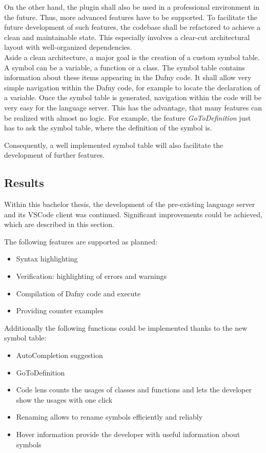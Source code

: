 On the other hand, the plugin shall also be used in a professional environment in the future.
Thus, more advanced features have to be supported.
To facilitate the future development of such features, the codebase shall be refactored to achieve a clean and maintainable state.
This especially involves a clear-cut architectural layout with well-organized dependencies.\\

Aside a clean architecture, a major goal is the creation of a custom symbol table.
A symbol can be a variable, a function or a class.
The symbol table contains information about these items appearing in the Dafny code.
It shall allow very simple navigation within the Dafny code, for example to locate the declaration of a variable.
Once the symbol table is generated, navigation within the code will be very easy for the language server.
This has the advantage, that many features can be realized with almost no logic.
For example, the feature \textit{GoToDefinition} just has to ask the symbol table, where the definition of the symbol is.

Consequently, a well implemented symbol table will also facilitate the development of further features.

\subsection{Results}
Within this bachelor thesis, the development of the pre-existing language server and its VSCode client was continued.
Significant improvements could be achieved, which are described in this section.

The following features are supported as planned:
\begin{itemize}
    \item Syntax highlighting
    \item Verification: highlighting of errors and warnings
    \item Compilation of Dafny code and execute
    \item Providing counter examples
\end{itemize}

Additionally the following functions could be implemented thanks to the new symbol table:
\begin{itemize}
    \item AutoCompletion suggestion
    \item GoToDefinition
    \item Code lens counts the usages of classes and functions and lets the developer show the usages with one click
    \item Renaming allows to rename symbols efficiently and reliably
    \item Hover information provide the developer with useful information about symbols
\end{itemize}

